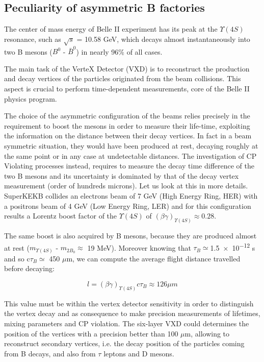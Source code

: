 
\subsection{Peculiarity of asymmetric B factories} \label{sec:vertex_decay}

The center of mass energy of Belle II experiment has its peak at the $\Upsilon(4S)$ resonance, such as $\sqrt{s}$ = 10.58 GeV, which decays almost instantaneously into two B mesons ($B^{0}$ - $\bar{B}^{0}$) in nearly 96\% of all cases. 

The main task of the VerteX Detector (VXD) is to reconstruct the production and decay vertices of the particles originated from the beam collisions. This aspect is crucial to perform time-dependent measurements, core of the Belle II physics program.

The choice of the asymmetric configuration of the beams relies precisely in the requirement to boost the mesons in order to measure their life-time, exploiting the information on the distance between their decay vertices. In fact in a beam symmetric situation, they would have been produced at rest, decaying roughly at the same point or in any case at undetectable distances. 
The investigation of CP Violating processes instead, requires to measure the decay time difference of the two B mesons and its uncertainty is dominated by that of the decay vertex measurement (order of hundreds microns). Let us look at this in more details.\\

SuperKEKB collides an electrons beam of 7 GeV (High Energy Ring, HER) with a positrons beam of 4 GeV (Low Energy Ring, LER) and for this configuration results a Lorentz boost factor of the $\Upsilon(4S)$ of $(\beta\gamma)_{\Upsilon(4S)} \approx 0.28 $.

The same boost is also acquired by B mesons, because they are produced almost at rest ($m_{\Upsilon(4S)}$ - $m_{2B_{0}}\approx$ 19 MeV). Moreover knowing that $\tau_{B}\simeq $\num{1.5e-12} s and so c$\tau_{B}\simeq$ 450 $\mu$m, we can compute the average flight distance travelled before decaying:

\begin{equation}
\textit{l} = (\beta\gamma)_{\Upsilon(4S)}c\tau_{B} \approx 126 \mu m  
\end{equation} 

This value must be within the vertex detector sensitivity in order to distinguish the vertex decay and as consequence to make precision measurements of lifetimes, mixing parameters and CP violation. The six-layer VXD could determines the position of the vertices with a precision better than 100 $\mu$m, allowing to reconstruct secondary vertices, i.e. the decay position of the particles coming from B decays, and also from $\tau$ leptons and D mesons.


